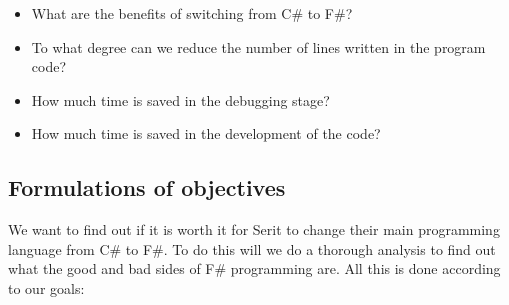 \documentclass[12pt, a4paper]{article}
\begin{document}
\begin{itemize}
\item What are the benefits of switching from C\# to F\#?
\item To what degree can we reduce the number of lines written in the program code?
\item How much time is saved in the debugging stage?
\item How much time is saved in the development of the code?
\end{itemize}

\newpage

\subsection{Formulations of objectives}

We want to find out if it is worth it for Serit to change their main programming language from C\# to F\#. To do this will we do a thorough analysis to find out what the good and bad sides of F\# programming are. All this is done according to our goals:
\end{document}
